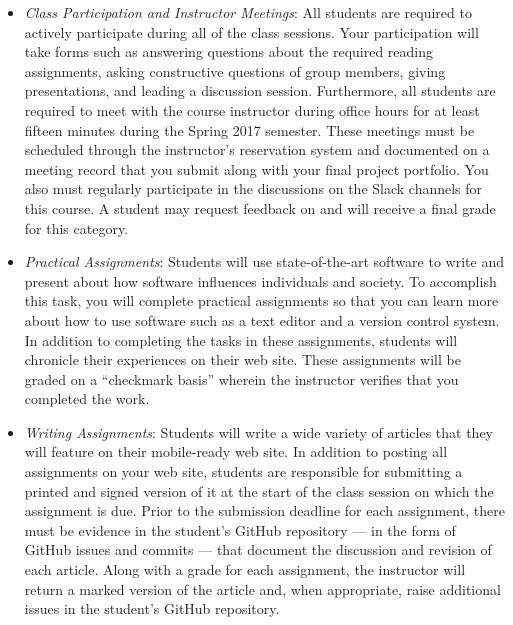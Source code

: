 \begin{itemize}

  \itemsep0em

  \item {\em Class Participation and Instructor Meetings\/}: All students are required to actively participate during
    all of the class sessions. Your participation will take forms such as answering questions about the required reading
    assignments, asking constructive questions of group members, giving presentations, and leading a discussion session.
    Furthermore, all students are required to meet with the course instructor during office hours for at least fifteen
    minutes during the Spring 2017 semester. These meetings must be scheduled through the instructor's reservation
    system and documented on a meeting record that you submit along with your final project portfolio. You also must
    regularly participate in the discussions on the Slack channels for this course. A student may request feedback on
    and will receive a final grade for this category.

  \item {\em Practical Assignments\/}: Students will use state-of-the-art software to write and present about how software
    influences individuals and society. To accomplish this task, you will complete practical assignments so that you can
    learn more about how to use software such as a text editor and a version control system. In addition to completing
    the tasks in these assignments, students will chronicle their experiences on their web site. These assignments will
    be graded on a ``checkmark basis'' wherein the instructor verifies that you completed the work.

  \item {\em Writing Assignments\/}: Students will write a wide variety of articles that they will feature on their
    mobile-ready web site. In addition to posting all assignments on your web site, students are responsible for
    submitting a printed and signed version of it at the start of the class session on which the assignment is due.
    Prior to the submission deadline for each assignment, there must be evidence in the student's GitHub repository ---
    in the form of GitHub issues and commits --- that document the discussion and revision of each article. Along with a
    grade for each assignment, the instructor will return a marked version of the article and, when appropriate, raise
    additional issues in the student's GitHub repository.


\end{itemize}
